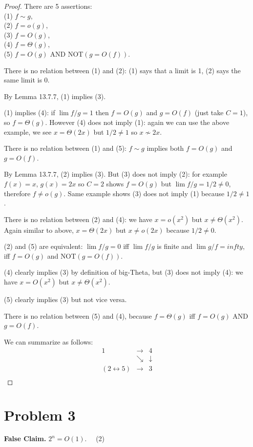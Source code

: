 \documentclass[14pt]{extarticle}
\begin{document}
\begin{proof}
There are 5 assertions: \\
(1) $f \sim g$,\\ (2) $f = o(g)$,\\ (3) $f = O(g)$,\\ (4) $f = \Theta(g)$,\\ (5) $f = O(g)$ AND NOT$(g = O(f))$.

There is no relation between (1) and (2): (1) says that a limit is 1, (2) says the same limit is 0.

By Lemma 13.7.7, (1) implies (3). 

(1) implies (4): if $\lim f/g = 1$ then $f = O(g)$ and $g = O(f)$ (just take $C = 1$), so $f = \Theta(g)$. However (4) does not imply (1): again we can use the above example, we see $x = \Theta(2x)$ but $1/2 \neq 1$ so $x \not\sim 2x$.

There is no relation between (1) and (5): $f \sim g$ implies both $f = O(g)$ and $g = O(f)$.

By Lemma 13.7.7, (2) implies (3). But (3) does not imply (2): for example $f(x) = x$, $g(x) = 2x$ so $C=2$ shows $f = O(g)$ but $\lim f/g = 1/2 \neq 0$, therefore $f \neq o(g)$. Same example shows (3) does not imply (1) because $1/2 \neq 1$.

There is no relation between (2) and (4): we have $x = o(x^2)$ but $x \neq \Theta(x^2)$. Again similar to above, $x = \Theta(2x)$ but $x \neq o(2x)$ because $1/2 \neq 0$.

(2) and (5) are equivalent: $\lim f/g = 0$ iff $\lim f/g$ is finite and $\lim g/f = infty$, iff $f = O(g)$ and NOT$(g = O(f))$.

(4) clearly implies (3) by definition of big-Theta, but (3) does not imply (4): we have $x = O(x^2)$ but $x \neq \Theta(x^2)$.

(5) clearly implies (3) but not vice versa.

There is no relation between (5) and (4), because $f = \Theta(g)$ iff $f = O(g)$ AND $g = O(f)$.

We can summarize as follows:
$$
\begin{array}{rcc}
1&\longrightarrow&4\\
&\searrow&\downarrow\\
(2 \leftrightarrow 5)&\longrightarrow&3\\
\end{array}
$$
\end{proof}

\section{Problem 3}
{\bf False Claim.} $2^n = O(1)$. \,\,\,\,\,\,(2)
\end{document}
